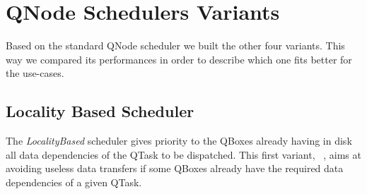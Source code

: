 \begin{algorithm}[H]
\begin{algorithmic}[1]
\begin{comment}
                \STATE $qmobo\_list \leftarrow$ List of QMobos which is possible to run LOW priority Qtasks
                \STATE $qrad\_list \leftarrow$ List of QRads by decreasing temperature
                \FOR{$qrad \in$ $qrad\_list$}
                    \FOR{$qmobo \in$ $qmobo\_list$}
                        \STATE Start the instance in in this $qmobo$
                        \STATE Update $nb\_qtask\_instances$
                        \IF{$nb\_waiting\_instances \eq$ 0}
                            \STATE return
                        \ENDIF
                    \ENDFOR
                \ENDFOR
            \ENDIF
        \ENDFOR
        \IF{$waiting\_instances \neq$ 0}
            \STATE \# Some $qtaks$ could not be started.
            \STATE Return the $waiting\_instances$ to the QNode Scheduler
        \ENDIF
\end{comment}
        \end{algorithmic}
\end{algorithm}


\section{QNode Schedulers Variants}

Based on the standard QNode scheduler we built the other four variants.
This way we compared its performances in order to describe which one fits better for the use-cases.

\subsection{Locality Based Scheduler}
\label{subsec:localityBased}

The \emph{LocalityBased} scheduler gives priority to the QBoxes already having in disk all data dependencies of the QTask to be dispatched.
This first variant, ~, aims at avoiding useless data transfers if some QBoxes already have the required data dependencies of a given QTask.

